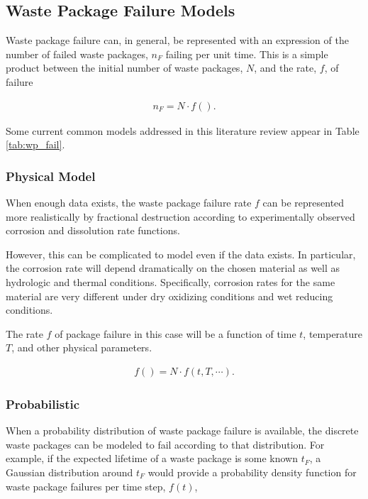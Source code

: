 
\subsection{Waste Package Failure Models}

Waste package failure can, in general, be represented with an expression of the 
number of failed waste packages, $n_F$ failing per unit time. This is a simple 
product between the initial number of waste packages, $N$, and the rate, $f$, of 
failure

\begin{align}
  n_F = N\cdot f().
  \label{rate}
\end{align}

Some current common models addressed in this literature review appear in Table 
\ref{tab:wp_fail}.




\subsubsection{Physical Model}

When enough data exists, the waste package failure rate $f$ can
be represented more realistically by fractional destruction according to
experimentally observed corrosion and dissolution rate functions.

However, this can be complicated to model even if the data exists. In
particular, the corrosion rate will depend dramatically on the chosen material 
as well as hydrologic and thermal conditions. Specifically, corrosion rates for 
the same material are very different under dry oxidizing conditions and wet 
reducing conditions. 

The rate $f$ of package  failure in this case will be a function of time $t$, 
temperature $T$, and other physical parameters.

\begin{align}
  f() = N\cdot f(t,T,\cdots).
  \label{rate}
\end{align}

\subsubsection{Probabilistic}

When a probability distribution of waste package failure is available, the 
discrete waste packages can be modeled to fail according to that distribution. 
For example, if the expected lifetime of a waste package is some known $t_F$, a 
Gaussian distribution around $t_F$ would provide a probability density function 
for waste package failures per time step, $f(t)$,

